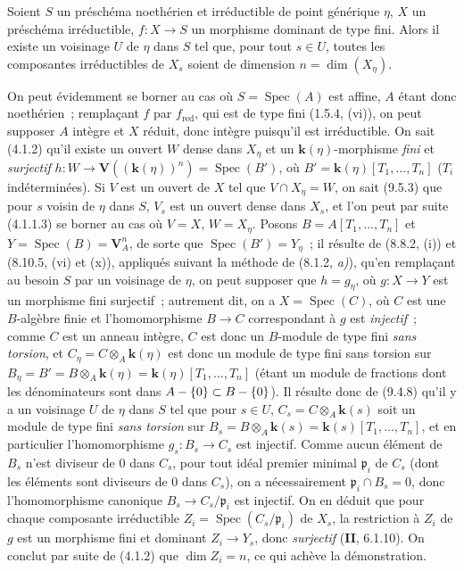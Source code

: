 \begin{corollary}[9.5.6]
\label{IV.9.5.6-fr}
Soient $S$ un préschéma noethérien et irréductible de point générique $\eta$,
$X$ un préschéma irréductible, $f:X\to S$ un morphisme dominant de type fini.
Alors il existe un voisinage $U$ de $\eta$ dans $S$ tel que, pour tout
$s\in U$, toutes les composantes irréductibles de $X_s$ soient de dimension
$n=\dim(X_\eta)$.
\end{corollary}

On peut évidemment se borner au cas où $S=\operatorname{Spec}(A)$ est affine,
$A$ étant donc noethérien~; remplaçant $f$ par $f_{\mathrm{red}}$, qui est de
type fini (1.5.4, (vi)), on peut
supposer $A$ intègre et $X$ réduit, donc intègre puisqu'il est irréductible. On
sait (4.1.2) qu'il existe un ouvert $W$ dense dans $X_\eta$ et un
$\boldsymbol{k}(\eta)$-morphisme \emph{fini} et \emph{surjectif}
$h:W\to\mathbf V((\boldsymbol{k}(\eta))^n)=\operatorname{Spec}(B')$, où
$B'=\boldsymbol{k}(\eta)[T_1,\ldots,T_n]$ ($T_i$ indéterminées). Si $V$ est un ouvert de
$X$ tel que $V\cap X_\eta=W$, on sait (9.5.3) que pour $s$ voisin de $\eta$
dans $S$, $V_s$ est un ouvert dense dans $X_s$, et l'on peut par suite (4.1.1.3)
se borner au cas où $V=X$, $W=X_\eta$. Posons
$B=A[T_1,\ldots,T_n]$ et $Y=\operatorname{Spec}(B)=\mathbf V_A^n$, de sorte
que $\operatorname{Spec}(B')=Y_\eta$~; il résulte de (8.8.2, (i)) et
(8.10.5, (vi) et (x)), appliqués suivant la méthode de (8.1.2, \emph{a)}),
qu'en remplaçant au besoin $S$ par un voisinage de $\eta$, on peut supposer que
$h=g_\eta$, où $g:X\to Y$ est un morphisme fini surjectif~; autrement dit, on
a $X=\operatorname{Spec}(C)$, où $C$ est une $B$-algèbre finie et
l'homomorphisme $B\to C$ correspondant à $g$ est \emph{injectif}~; comme $C$
est un anneau intègre, $C$ est donc un $B$-module de type fini \emph{sans
torsion}, et $C_\eta=C\otimes_A \boldsymbol{k}(\eta)$ est donc un module de type fini sans
torsion sur $B_\eta=B'=B\otimes_A \boldsymbol{k}(\eta)=\boldsymbol{k}(\eta)[T_1,\ldots,T_n]$ (étant un
module de fractions dont les dénominateurs sont dans
$A-\{0\}\subset B-\{0\}$). Il résulte donc de (9.4.8) qu'il y a un voisinage
$U$ de $\eta$ dans $S$ tel que pour $s\in U$,
$C_s=C\otimes_A \boldsymbol{k}(s)$ soit un module de type fini \emph{sans torsion} sur
$B_s=B\otimes_A \boldsymbol{k}(s)=\boldsymbol{k}(s)[T_1,\ldots,T_n]$, et en particulier l'homomorphisme
$g_s:B_s\to C_s$ est injectif. Comme aucun élément de $B_s$ n'est diviseur de
0 dans $C_s$, pour tout idéal premier minimal $\mathfrak p_i$ de $C_s$ (dont
les éléments sont diviseurs de 0 dans $C_s$), on a nécessairement
$\mathfrak p_i\cap B_s=0$, donc l'homomorphisme canonique
$B_s\to C_s/\mathfrak p_i$ est injectif. On en déduit que pour chaque
composante irréductible $Z_i=\operatorname{Spec}(C_s/\mathfrak p_i)$ de $X_s$,
la restriction à $Z_i$ de $g$ est un morphisme fini et dominant $Z_i\to Y_s$,
donc \emph{surjectif} (\textbf{II}, 6.1.10). On conclut par suite de (4.1.2)
que $\dim Z_i=n$, ce qui achève la démonstration.

